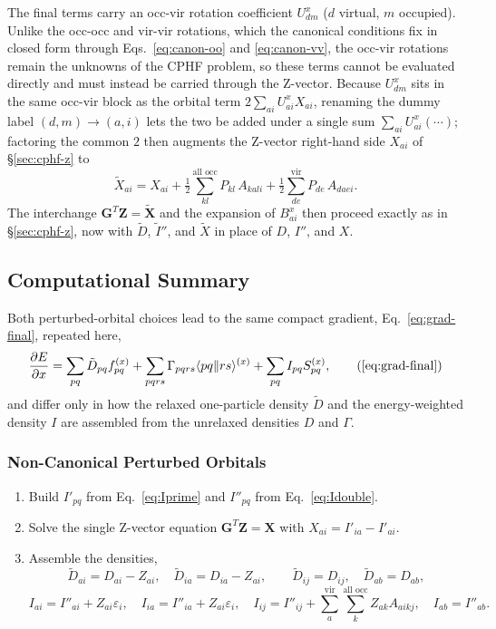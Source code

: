 \documentclass[12pt]{article}
\newcommand{\adb}[2]{\langle #1 \| #2 \rangle}
\newcommand{\vir}{\text{vir}}
\newcommand{\alloc}{\text{all occ}}   %
\begin{document}
The final terms carry an occ-vir rotation coefficient $U^x_{dm}$ ($d$ virtual, $m$
occupied).  Unlike the occ-occ and vir-vir rotations, which the canonical conditions fix
in closed form through Eqs.~\eqref{eq:canon-oo} and \eqref{eq:canon-vv}, the
occ-vir
rotations remain the unknowns of the CPHF problem, so these terms cannot be
evaluated directly and must instead be carried through the Z-vector.  Because
$U^x_{dm}$ sits in the same occ-vir block as the orbital term
$2\sum_{ai}U^x_{ai}X_{ai}$, renaming the dummy label $(d,m)\to(a,i)$ lets the two
be added under a single sum $\sum_{ai}U^x_{ai}(\cdots)$; factoring the common $2$
then augments the Z-vector right-hand side $X_{ai}$ of \S\ref{sec:cphf-z} to
\begin{equation}
\tilde{X}_{ai} = X_{ai}
+ \tfrac12\sum_{kl}^{\alloc}P_{kl}\,A_{kali}
+ \tfrac12\sum_{de}^{\vir}P_{de}\,A_{daei}.
\label{eq:Xtilde}
\end{equation}
The interchange $\mathbf{G}^{T}\mathbf{Z}=\tilde{\mathbf{X}}$ and the expansion of
$B^x_{ai}$ then proceed exactly as in \S\ref{sec:cphf-z}, now with $\tilde{D}$, $\tilde{I}''$,
and $\tilde{X}$ in place of $D$, $I''$, and $X$.

\subsection{Computational Summary}
\label{sec:comp-summary-1}

Both perturbed-orbital choices lead to the same compact gradient,
Eq.~\eqref{eq:grad-final}, repeated here,
\begin{equation}
\frac{\partial E}{\partial x}
= \sum_{pq} \tilde{D}_{pq} f^{(x)}_{pq}
+ \sum_{pqrs}\Gamma_{pqrs}\adb{pq}{rs}^{(x)}
+ \sum_{pq} I_{pq} S^{(x)}_{pq},
\tag{\ref{eq:grad-final}}
\end{equation}
and differ only in how the relaxed one-particle density $\tilde{D}$ and the
energy-weighted density $I$ are assembled from the unrelaxed densities $D$ and
$\Gamma$.

\subsubsection{Non-Canonical Perturbed Orbitals}
\begin{enumerate}
\item Build $I'_{pq}$ from Eq.~\eqref{eq:Iprime} and $I''_{pq}$ from
Eq.~\eqref{eq:Idouble}.
\item Solve the single Z-vector equation $\mathbf{G}^{T}\mathbf{Z}=\mathbf{X}$
with $X_{ai}=I'_{ia}-I'_{ai}$.
\item Assemble the densities,
\begin{equation*}
\tilde{D}_{ai}=D_{ai}-Z_{ai},\quad \tilde{D}_{ia}=D_{ia}-Z_{ai},\qquad
\tilde{D}_{ij}=D_{ij},\quad \tilde{D}_{ab}=D_{ab},
\end{equation*}
\begin{equation*}
I_{ai}=I''_{ai}+Z_{ai}\varepsilon_i,\quad
I_{ia}=I''_{ia}+Z_{ai}\varepsilon_i,\quad
I_{ij}=I''_{ij}+\sum_{a}^{\vir}\sum_{k}^{\alloc} Z_{ak}A_{aikj},\quad
I_{ab}=I''_{ab}.
\end{equation*}
\end{enumerate}
\end{document}
